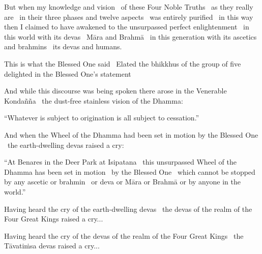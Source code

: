 \begin{english-only-hang}
  But when my knowledge and vision \breathmark\ of these Four Noble Truths \breathmark\ as they really are \breathmark\ in their three phases and twelve aspects \breathmark\ was entirely purified \breathmark\ in this way then I claimed to have awakened to the unsurpassed perfect enlightenment \breathmark\ in this world with its devas \breathmark\ Māra and Brahmā \breathmark\ in this generation with its ascetics and brahmins \breathmark\ its devas and humans.
\end{english-only-hang}

\begin{english-only-hang}
  This is what the Blessed One said \breathmark\ Elated the bhikkhus of the group of five delighted in the Blessed One's statement
\end{english-only-hang}

\begin{english-only-hang}
  And while this discourse was being spoken there arose in the Venerable Kondañña \breathmark\ the dust-free stainless vision of the Dhamma:
\end{english-only-hang}

\begin{english-only-hang}
  ``Whatever is subject to origination is all subject to cessation.''
\end{english-only-hang}

\begin{english-only-hang}
  And when the Wheel of the Dhamma had been set in motion by the Blessed One \breathmark\ the earth-dwelling devas raised a cry:
\end{english-only-hang}

\begin{english-only-hang}
  ``At Benares in the Deer Park at Isipatana \breathmark\ this unsurpassed Wheel of the Dhamma has been set in motion \breathmark\ by the Blessed One \breathmark\ which cannot be stopped by any ascetic or brahmin \breathmark\ or deva or Māra or Brahmā or by anyone in the world.''
\end{english-only-hang}

\begin{english-only-hang}
  Having heard the cry of the earth-dwelling devas \breathmark\ the devas of the realm of the Four Great Kings raised a cry...
\end{english-only-hang}

\begin{english-only-hang}
  Having heard the cry of the devas of the realm of the Four Great Kings \breathmark\ the Tāvatiṁsa devas raised a cry...
\end{english-only-hang}

